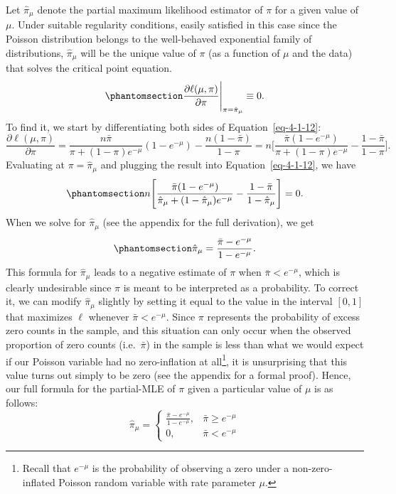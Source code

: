 \documentclass[
  12pt]{article}
\begin{document}
Let \(\hat{\pi}_{\mu}\) denote the partial maximum likelihood estimator
of \(\pi\) for a given value of \(\mu\). Under suitable regularity
conditions, easily satisfied in this case since the Poisson distribution
belongs to the well-behaved exponential family of distributions,
\(\hat{\pi}_{\mu}\) will be the unique value of \(\pi\) (as a function
of \(\mu\) and the data) that solves the critical point equation.
\begin{equation}\phantomsection\label{eq-4-1-13}{
\frac{\partial \ell(\mu, \pi)}{\partial\pi}\Bigg|_{\pi = \hat{\pi}_{\mu}} \equiv 0.
}\end{equation} To find it, we start by differentiating both sides of
Equation~\ref{eq-4-1-12}: \[
\frac{\partial \ell(\mu, \pi)}{\partial\pi} = \frac{n \bar{\pi}}{\pi + (1-\pi)e^{-\mu}}(1 - e^{-\mu}) - \frac{n(1 - \bar{\pi})}{1 - \pi}
                                            = n \Bigg[\frac{\bar{\pi}(1 - e^{-\mu})}{\pi + (1-\pi)e^{-\mu}} - \frac{1 - \bar{\pi}}{1 - \pi} \Bigg].
\] Evaluating at \(\pi = \hat{\pi}_{\mu}\) and plugging the result into
Equation~\ref{eq-4-1-12}, we have
\begin{equation}\phantomsection\label{eq-4-1-14}{
n \Bigg[\frac{\bar{\pi}(1 - e^{-\mu})}{\hat{\pi}_{\mu} + (1-\hat{\pi}_{\mu})e^{-\mu}} - \frac{1 - \bar{\pi}}{1 - \hat{\pi}_{\mu}} \Bigg] = 0. 
}\end{equation} When we solve for \(\hat{\pi}_{\mu}\) (see the appendix
for the full derivation), we get
\begin{equation}\phantomsection\label{eq-4-1-15}{
\hat{\pi}_{\mu} = \frac{\bar{\pi} - e^{-\mu}}{1 - e^{-\mu}}.
}\end{equation} This formula for \(\hat{\pi}_{\mu}\) leads to a negative
estimate of \(\pi\) when \(\bar{\pi} < e^{-\mu}\), which is clearly
undesirable since \(\pi\) is meant to be interpreted as a probability.
To correct it, we can modify \(\hat{\pi}_{\mu}\) slightly by setting it
equal to the value in the interval \([0,1]\) that maximizes \(\ell\)
whenever \(\bar{\pi} < e^{-\mu}\). Since \(\pi\) represents the
probability of excess zero counts in the sample, and this situation can
only occur when the observed proportion of zero counts
(i.e.~\(\bar{\pi}\)) in the sample is less than what we would expect if
our Poisson variable had no zero-inflation at all\footnote{Recall that
  \(e^{-\mu}\) is the probability of observing a zero under a
  non-zero-inflated Poisson random variable with rate parameter \(\mu\).},
it is unsurprising that this value turns out simply to be zero (see the
appendix for a formal proof). Hence, our full formula for the
partial-MLE of \(\pi\) given a particular value of \(\mu\) is as
follows: \[
\hat{\pi}_{\mu} = \begin{cases}
                  \frac{\bar{\pi} - e^{-\mu}}{1 - e^{-\mu}}, & \bar{\pi} \geq e^{-\mu} \\
                  0, & \bar{\pi} < e^{-\mu}
            \end{cases}
\]
\end{document}
